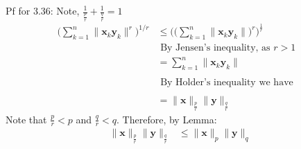 \documentclass[letterpaper,12pt]{article}
\theoremstyle{definition}
\begin{document}
Pf for 3.36:
Note, $\frac{1}{\frac{p}{r}}+\frac{1}{\frac{q}{r}} = 1$
\begin{align*}
    \big( \sum_{k=1}^n\|\mathbf{x}_k \mathbf{y}_k \|^r \big) ^{1/r} &\leq \big( \big(\sum_{k=1}^n\|\mathbf{x}_k \mathbf{y}_k \|\big)^r\big)^{\frac{1}{r}}& \\
    &  \text{ By Jensen's inequality, as $r>1$} \\
    & = \sum_{k=1}^n\|\mathbf{x}_k \mathbf{y}_k \| \quad \\\\
    &\text{         By Holder's inequality we have}\\\\
    & = \|\mathbf{x}\|_{\frac{p}{r}}\|\mathbf{y}\|_{\frac{q}{r}}
\end{align*}
Note that $\frac{p}{r} < p$ and $\frac{q}{r}<q$. Therefore, by Lemma:
\begin{align*}
    \|\mathbf{x}\|_{\frac{p}{r}}\|\mathbf{y}\|_{\frac{q}{r}} & \leq \|\mathbf{x}\|_p \|\mathbf{y}\|_q 
\end{align*}
\end{document}
